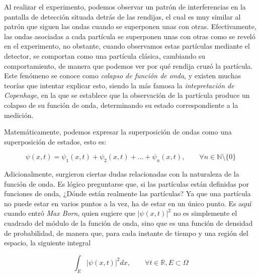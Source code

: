 \documentclass[12pt]{article}
\numberwithin{equation}{section} %
\begin{document}
        \vspace{5mm}

        Al realizar el experimento, podemos observar un patrón de interferencias en la pantalla de detección situada detrás de las rendijas, el cual es muy similar al patrón que siguen las ondas cuando se superponen unas con otras. Efectivamente, las ondas asociadas a cada partícula se superponen unas con otras como se reveló en el experimento, no obstante, cuando observamos estas partículas mediante el detector, se comportan como una partícula clásica, cambiando su comportamiento, de manera que podemos ver por qué rendija cruzó la partícula. Este fenómeno se conoce como \textit{colapso de función de onda}, y existen muchas teorías que intentar explicar esto, siendo la más famosa la \textit{intepretación de Copenhage}, en la que se establece que la observación de la partícula produce un colapso de su función de onda, determinando su estado correspondiente a la medición.

        \vspace{5mm}

        Matemáticamente, podemos expresar la superposición de ondas como una superposición de estados, esto es:

        \vspace{5mm}

        \begin{equation}
            \psi(x, t) = \psi_{1}(x, t) + \psi_{2}(x, t) + \dots + \psi_{n}(x, t), \qquad \forall n \in \mathbb{N} \setminus \{0\}
            \label{eq: superposicion}
        \end{equation}

        \vspace{5mm}

        Adicionalmente, surgieron ciertas dudas relacionadas con la naturaleza de la función de onda. Es lógico preguntarse que, si las partículas están definidas por funciones de onda, ¿Dónde están realmente las partículas? Ya que una partícula no puede estar en varios puntos a la vez, ha de estar en un único punto. Es aquí cuando entró \textit{Max Born}, quien sugiere que \( \lvert \psi(x, t) \rvert ^ {2} \) no es simplemente el cuadrado del módulo de la función de onda, sino que es una función de densidad de probabilidad, de manera que, para cada instante de tiempo y una región del espacio, la siguiente integral

        \vspace{5mm}

        \begin{equation}
            \int_{E} \lvert \psi(x, t) \rvert ^ {2} dx, \qquad \forall t \in \mathbb{R}, E \subset \Omega
            \label{eq: densidad_probabilidad_onda}
        \end{equation}
\end{document}
